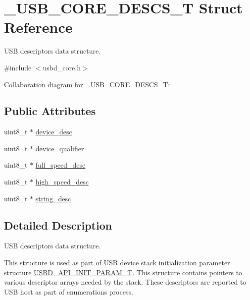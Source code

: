 \hypertarget{struct__USB__CORE__DESCS__T}{}\section{\+\_\+\+U\+S\+B\+\_\+\+C\+O\+R\+E\+\_\+\+D\+E\+S\+C\+S\+\_\+T Struct Reference}
\label{struct__USB__CORE__DESCS__T}


U\+SB descriptors data structure.  




{\ttfamily \#include $<$usbd\+\_\+core.\+h$>$}



Collaboration diagram for \+\_\+\+U\+S\+B\+\_\+\+C\+O\+R\+E\+\_\+\+D\+E\+S\+C\+S\+\_\+T\+:
\subsection*{Public Attributes}
\begin{DoxyCompactItemize}
\item 
uint8\+\_\+t $\ast$ \hyperlink{struct__USB__CORE__DESCS__T_a15c6d25f9b77c7034439715d769f20f3}{device\+\_\+desc}
\item 
uint8\+\_\+t $\ast$ \hyperlink{struct__USB__CORE__DESCS__T_aec1cd64157ed8c38c31b561f6857e6cf}{device\+\_\+qualifier}
\item 
uint8\+\_\+t $\ast$ \hyperlink{struct__USB__CORE__DESCS__T_adc04768aaa60355fd9934895955b7439}{full\+\_\+speed\+\_\+desc}
\item 
uint8\+\_\+t $\ast$ \hyperlink{struct__USB__CORE__DESCS__T_a99f740c42483df30cc2924383c8a4d2b}{high\+\_\+speed\+\_\+desc}
\item 
uint8\+\_\+t $\ast$ \hyperlink{struct__USB__CORE__DESCS__T_af785297629e79dec58480668d005c04e}{string\+\_\+desc}
\end{DoxyCompactItemize}


\subsection{Detailed Description}
U\+SB descriptors data structure. 

This structure is used as part of U\+SB device stack initialization parameter structure \hyperlink{group__USBD__Core_gaa6e8171941c1ae63afed95974e0f18e3}{U\+S\+B\+D\+\_\+\+A\+P\+I\+\_\+\+I\+N\+I\+T\+\_\+\+P\+A\+R\+A\+M\+\_\+T}. This structure contains pointers to various descriptor arrays needed by the stack. These descriptors are reported to U\+SB host as part of enumerations process.

